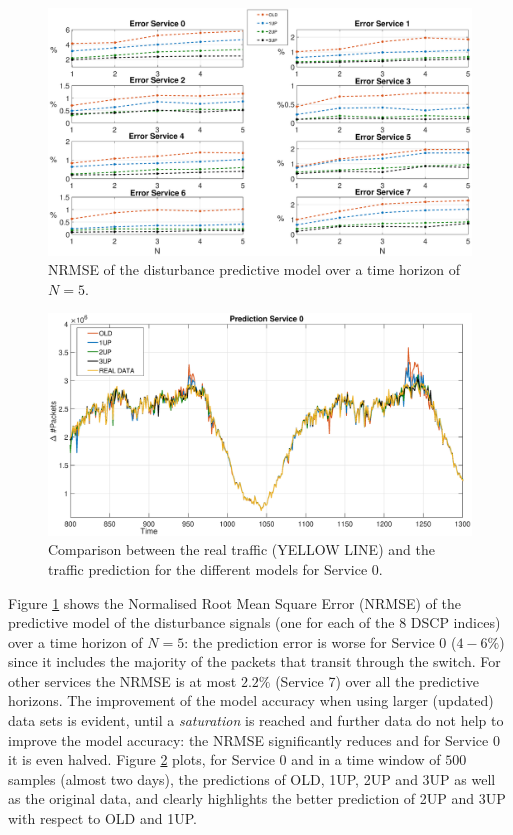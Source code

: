 \begin{figure}[h!]
	\centering
	\includegraphics[trim={120 0 120 0}, width=1\linewidth]{figure/Error_Disturbance.eps}
	\caption{NRMSE of the disturbance predictive model over a time horizon of $N=5$.}
	\label{fig:{errorDist}}
\end{figure}
\begin{figure}[h!]
	\centering
	\includegraphics[trim={120 0 120 0}, width=1\linewidth]{figure/Error_Disturbance_Packets.eps}
	\caption{Comparison between the real traffic (YELLOW LINE) and the traffic prediction for the different models for Service 0.}
	\label{fig:{errorPack}}
\end{figure}

Figure \ref{fig:{errorDist}} shows the Normalised Root Mean Square Error (NRMSE) of the predictive model of the disturbance signals (one for each of the 8 DSCP indices) over a time horizon of $N=5$: the prediction error is worse for Service $0$ ($4-6\%$) since it includes the majority of the packets that transit through the switch. For other services the NRMSE is at most $2.2\%$ (Service 7) over all the predictive horizons. The improvement of the model accuracy when using larger (updated) data sets is evident, until a \textit{saturation} is reached and further data do not help to improve the model accuracy: the NRMSE significantly reduces and for Service 0 it is even halved. Figure \ref{fig:{errorPack}} plots, for Service $0$ and in a time window of $500$ samples (almost two days), the predictions of OLD, 1UP, 2UP and 3UP as well as the original data, and clearly highlights the better prediction of 2UP and 3UP with respect to OLD and 1UP.

